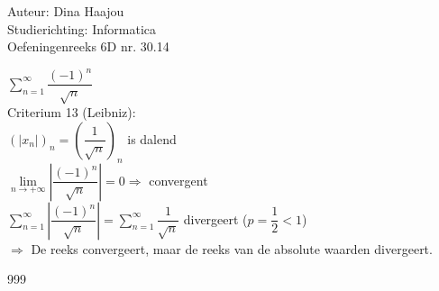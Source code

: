 \documentclass[a4paper]{article}
\begin{document}
	
	\noindent \large Auteur: Dina Haajou \\
	\noindent \large Studierichting:  Informatica\\
	\noindent \large Oefeningenreeks 6D nr. 30.14\\
	
	\medskip
	
	\normalsize
	
	$\displaystyle\sum\limits_{n=1}^{\infty} \dfrac{(-1)^n}{\sqrt{n}}$\\
	
	Criterium 13 (Leibniz):\\
	
	$(|x_n|)_n = \left(\dfrac{1}{\sqrt{n}}\right)_n$ is dalend\\
	
	$\displaystyle\lim\limits_{n \to +\infty} \left| \dfrac{(-1)^n}{\sqrt{n}} \right| = 0 \Rightarrow$ convergent\\
	
	$\displaystyle\sum\limits_{n=1}^{\infty} \left| \dfrac{(-1)^n}{\sqrt{n}} \right| = \displaystyle\sum\limits_{n=1}^{\infty} \dfrac{1}{\sqrt{n}}$ divergeert ($p = \dfrac{1}{2} < 1$)\\
	
	$\Rightarrow$ De reeks convergeert, maar de reeks van de absolute waarden divergeert.\\
	
	\begin{thebibliography}{999}
	\end{thebibliography}
\end{document}

